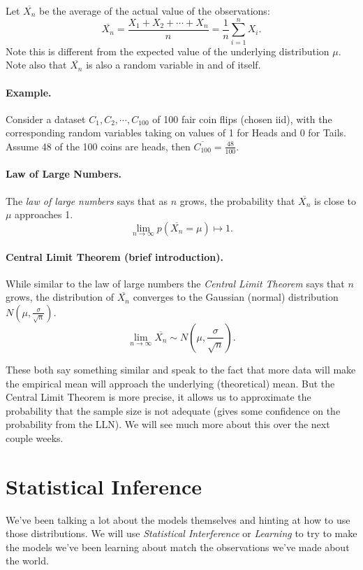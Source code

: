 Let $\overline{X_n}$ be the average of the actual value of the observations:
\[\overline{X_n} = \frac{X_1 + X_2 + \cdots + X_n}{n} = \frac{1}{n} \sum_{i=1}^n X_i.\]
Note this is different from the expected value of the underlying distribution $\mu$.
Note also that $\overline{X_n}$ is also a random variable in and of itself. 

\paragraph{Example. }
Consider a dataset $C_1, C_2,\cdots,C_{100}$ of 100 fair coin flips (chosen iid), with the corresponding random variables 
taking on values of 1 for Heads and 0 for Tails. 
Assume 48 of the 100 coins are heads, then $\overline{C_{100}} = \frac{48}{100}$. 


\paragraph{Law of Large Numbers.} The \emph{law of large numbers} says that as $n$ grows, the probability that $\overline{X_n}$ is close to $\mu$ approaches 1. 
\[\lim_{n\rightarrow\infty} p\left(\overline{X_n}=\mu\right) \mapsto 1.\]

\paragraph{Central Limit Theorem (brief introduction).} While similar to the law of large numbers the \emph{Central Limit Theorem} says that $n$ grows, 
the distribution of $\overline{X_n}$ converges to the Gaussian (normal) distribution $N\left(\mu, \frac{\sigma}{\sqrt{n}}\right)$. 
\[\lim_{n\rightarrow\infty} \overline{X_n} \sim N\left(\mu, \frac{\sigma}{\sqrt{n}}\right).\]

These both say something similar and speak to the fact that more data will make the empirical mean will approach the underlying (theoretical) mean. 
But the Central Limit Theorem is more precise, it allows us to approximate the probability that the sample size is not adequate 
(gives some confidence on the probability from the LLN).
We will see much more about this over the next couple weeks. 

\section{Statistical Inference}
We've been talking a lot about the models themselves and hinting at how to use those distributions. 
We will use \emph{Statistical Interference} or \emph{Learning} to try to make the models we've been learning about
match the observations we've made about the world. 
 
